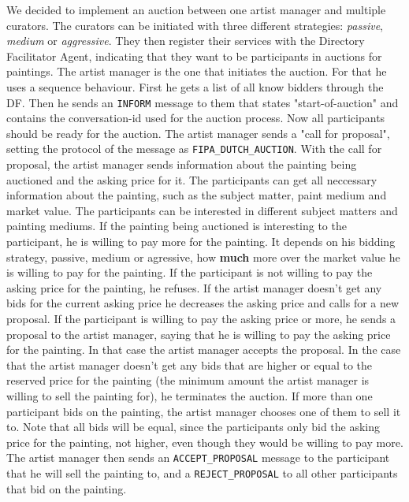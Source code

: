 \documentclass[a4paper, 11pt]{article}
\begin{document}
We decided to implement an auction between one artist manager and multiple curators. The curators can be initiated with three different strategies: \textit{passive}, \textit{medium} or \textit{aggressive}. They then register their services with the Directory Facilitator Agent, indicating that they want to be participants in auctions for paintings. The artist manager is the one that initiates the auction. For that he uses a sequence behaviour. First he gets a list of all know bidders through the DF. Then he sends an \texttt{INFORM} message to them that states "start-of-auction" and contains the conversation-id used for the auction process. Now all participants should be ready for the auction. The artist manager sends a "call for proposal", setting the protocol of the message as \texttt{FIPA\_DUTCH\_AUCTION}. With the call for proposal, the artist manager sends information about the painting being auctioned and the asking price for it. The participants can get all neccessary information about the painting, such as the subject matter, paint medium and market value. The participants can be interested in different subject matters and painting mediums. If the painting being auctioned is interesting to the participant, he is willing to pay more for the painting. It depends on his bidding strategy, passive, medium or agressive, how \textbf{much} more over the market value he is willing to pay for the painting. If the participant is not willing to pay the asking price for the painting, he refuses. If the artist manager doesn't get any bids for the current asking price he decreases the asking price and calls for a new proposal. If the participant is willing to pay the asking price or more, he sends a proposal to the artist manager, saying that he is willing to pay the asking price for the painting. In that case the artist manager accepts the proposal. In the case that the artist manager doesn't get any bids that are higher or equal to the reserved price for the painting (the minimum amount the artist manager is willing to sell the painting for), he terminates the auction. If more than one participant bids on the painting, the artist manager chooses one of them to sell it to. Note that all bids will be equal, since the participants only bid the asking price for the painting, not higher, even though they would be willing to pay more. The artist manager then sends an \texttt{ACCEPT\_PROPOSAL} message to the participant that he will sell the painting to, and a \texttt{REJECT\_PROPOSAL} to all other participants that bid on the painting.
\end{document}

